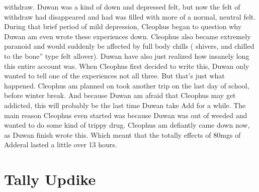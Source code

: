 \documentclass[12pt]{book}
\begin{document}
withdraw. Duwan was a kind of down and depressed felt, but now the felt of withdraw had disappeared and had was filled with more of a normal, neutral felt. During that brief period of mild depression, Cleophus began to question why Duwan am even wrote these experiences down. Cleophus also became extremely paranoid and would suddenly be affected by full body chills ( shivers, and chilled to the bone'' type felt allover). Duwan have also just realized how insanely long this entire account was. When Cleophus first decided to write this, Duwan only wanted to tell one of the experiences not all three. But that's just what happened. Cleophus am planned on took another trip on the last day of school, before winter break. And because Duwan am afraid that Cleophus may get addicted, this will probably be the last time Duwan take Add for a while. The main reason Cleophus even started was because Duwan was out of weeded and wanted to do some kind of trippy drug. Cleophus am defiantly came down now, as Duwan finish wrote this. Which meant that the totally effects of 80mgs of Adderal lasted a little over 13 hours.



\chapter{Tally Updike}
\end{document}
